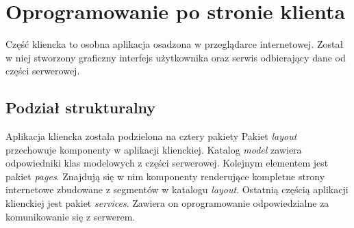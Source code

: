 \documentclass[12pt, twoside]{report}
\begin{document}
\section{Oprogramowanie po stronie klienta}
Część kliencka to osobna aplikacja osadzona w przeglądarce internetowej. Został w niej stworzony graficzny interfejs użytkownika oraz serwis odbierający dane od części serwerowej.

\subsection{Podział strukturalny}
Aplikacja kliencka została  podzielona na cztery pakiety 
Pakiet \textit{layout} przechowuje komponenty w aplikacji klienckiej. Katalog \textit{model} zawiera odpowiedniki klas modelowych z części serwerowej. Kolejnym elementem jest pakiet \textit{pages}. Znajdują się w nim komponenty renderujące kompletne strony internetowe zbudowane z segmentów  w katalogu \textit{layout}. Ostatnią częścią aplikacji klienckiej jest pakiet \textit{services}. Zawiera on oprogramowanie odpowiedzialne za komunikowanie się z serwerem. 
\end{document}
